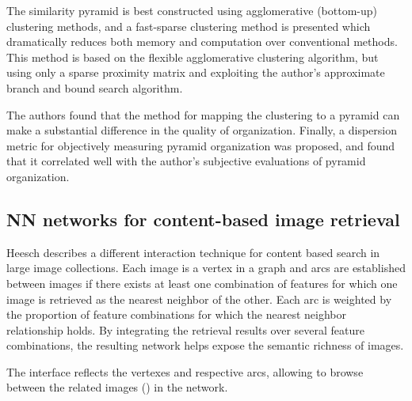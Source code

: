 The similarity pyramid is best constructed using agglomerative (bottom-up) clustering methods, and a fast-sparse clustering method is presented which dramatically reduces both memory and computation over conventional methods. This method is based on the flexible agglomerative clustering algorithm, but using only a sparse proximity matrix and exploiting the author's approximate branch and bound search algorithm.

The authors found that the method for mapping the clustering to a pyramid can make a substantial difference in the quality of organization. Finally, a dispersion metric for objectively measuring pyramid organization was proposed, and found that it correlated well with the author's subjective evaluations of pyramid organization.



\subsection{NN networks for content-based image retrieval} %
\label{sub:Heesch}

Heesch \cite{Heesch:2004p2675} describes a different interaction technique for content based search in large image collections. Each image is a vertex in a graph and arcs are established between images if there exists at least one combination of features for which one image is retrieved as the nearest neighbor of the other. Each arc is weighted by the proportion of feature combinations for which the nearest neighbor relationship holds. By integrating the retrieval results over several feature combinations, the resulting network helps expose the semantic richness of images.

The interface reflects the vertexes and respective arcs, allowing to browse between the related images () in the network.

